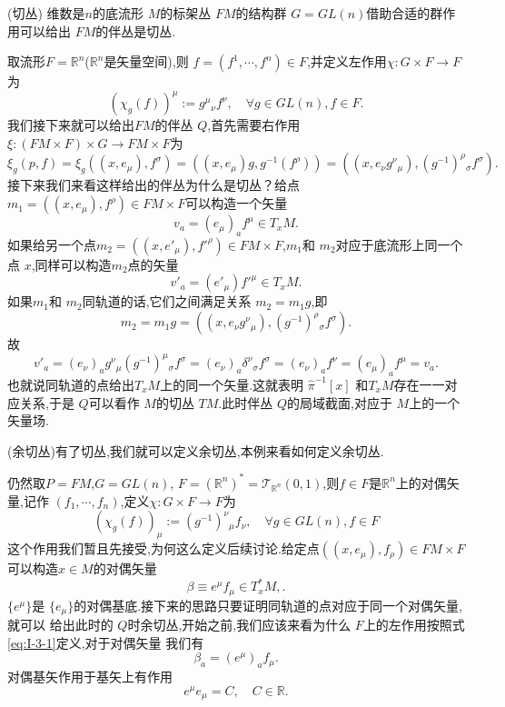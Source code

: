 \documentclass[../main.tex]{subfiles}
\begin{document}
 \begin{example}
   \label{ex:I-3-4}
   {\color{red}(切丛)} 维数是$n$的底流形 $M$的标架丛 $FM$的结构群 $G = GL(n)$借助合适的群作用可以给出 $FM$的伴丛是切丛.
 \end{example}
 取流形$F = \mathbb{R}^n$($\mathbb{R}^n$是矢量空间),则 $f = (f^1, \cdots ,f^n) \in F$,并定义左作用$\chi: G \times F \to F$为\[
   (\chi_g(f))^\mu := g^{\mu}{}_{\nu}f^\nu, \quad \forall g\in GL(n), f\in F 
 .\] 
 我们接下来就可以给出$FM$的伴丛 $Q$,首先需要右作用 $\xi:(FM \times F) \times G \to FM \times F$为\[
 \xi_g(p,f) =  \xi_g((x,e_\mu),f^\sigma) = ((x,e_\mu)g,g^{-1}(f^\rho)) = ((x,e_\nu g^{\nu}{}_{\mu} ),(g^{-1})^{\rho}{}_{\sigma}f^\sigma)
 .\]  
 接下来我们来看这样给出的伴丛为什么是切丛？给点$m_1 = ((x,e_\mu),f^\rho) \in FM \times F$可以构造一个矢量\[
   v_a = (e_\mu)_a f^\mu \in T_xM 
 .\] 
 如果给另一个点$m_2=((x,e'_\mu),f'^\rho) \in FM \times F$,$m_1$和 $m_2$对应于底流形上同一个点 $x$,同样可以构造$m_2$点的矢量 \[
   v'_a = (e'_\mu) f'^\mu \in T_xM 
 .\] 
 如果$m_1$和 $m_2$同轨道的话,它们之间满足关系 $m_2 = m_1g$,即 \[
 m_2 = m_1g = ((x,e_\nu g^{\nu}{}_{\mu}),(g^{-1})^{\rho}{}_{\sigma}f^\sigma)
 .\] 
 故\[
   v'_a = (e_\nu)_a g^{\nu}{}_{\mu} (g^{-1})^{\mu}{}_{\sigma}f^\sigma = (e_\nu)_a \delta^{\nu}{}_{\sigma}f^\sigma = (e_\nu)_a f^\nu = (e_\mu)_a f^\mu = v_a
 .\] 
 也就说同轨道的点给出$T_xM$上的同一个矢量.这就表明 $\hat{\pi}^{-1}[x]$ 和$T_xM$存在一一对应关系,于是
  $Q$可以看作 $M$的切丛 $TM$.此时伴丛 $Q$的局域截面,对应于 $M$上的一个矢量场.
  \begin{example}
    \label{ex:I-3-5}
  {\color{red}(余切丛)}有了切丛,我们就可以定义余切丛,本例来看如何定义余切丛.
  \end{example}
  仍然取$P = FM$,$G = GL(n)$, $F = (\mathbb{R}^n)^* = \mathscr{T}_{\mathbb{R}^n}(0,1)$,则$f \in F$是$\mathbb{R}^n$上的对偶矢量,记作 $(f_1,\cdots,f_n)$,定义$\chi:G \times F \to F$为
  \begin{equation}
    (\chi_g(f))_\mu := (g^{-1})^{\nu}{}_{\mu}f_\nu, \quad \forall g \in GL(n), f \in F 
    \label{eq:I-3-1}
  \end{equation}
  这个作用我们暂且先接受,为何这么定义后续讨论.给定点$((x,e_\mu), f_\rho) \in FM \times F$可以构造$x \in M$的对偶矢量\[
  \beta \equiv e^\mu f_\mu \in T^*_xM, 
.\] $\{e^\mu\}$是 $\{e_\mu\}$的对偶基底.接下来的思路只要证明同轨道的点对应于同一个对偶矢量,就可以
给出此时的 $Q$时余切丛,开始之前,我们应该来看为什么 $F$上的左作用按照式\ref{eq:I-3-1}定义,对于对偶矢量
我们有 \[
  \beta_a = (e^\mu)_a f_\mu
.\] 
对偶基矢作用于基矢上有作用\[
  e^\mu e_\mu = C ,\quad C\in\mathbb{R} 
.\]
\end{document}
